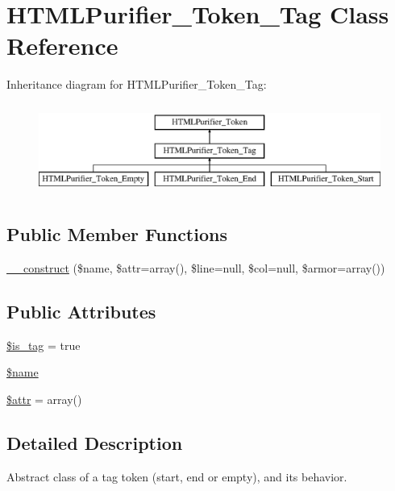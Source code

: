 \hypertarget{classHTMLPurifier__Token__Tag}{\section{H\+T\+M\+L\+Purifier\+\_\+\+Token\+\_\+\+Tag Class Reference}
\label{classHTMLPurifier__Token__Tag}
}
Inheritance diagram for H\+T\+M\+L\+Purifier\+\_\+\+Token\+\_\+\+Tag\+:\begin{figure}[H]
\begin{center}
\leavevmode
\includegraphics[height=3.000000cm]{classHTMLPurifier__Token__Tag}
\end{center}
\end{figure}
\subsection*{Public Member Functions}
\begin{DoxyCompactItemize}
\item 
\hyperlink{classHTMLPurifier__Token__Tag_a6666180bac25359b4228128745886c76}{\+\_\+\+\_\+construct} (\$name, \$attr=array(), \$line=null, \$col=null, \$armor=array())
\end{DoxyCompactItemize}
\subsection*{Public Attributes}
\begin{DoxyCompactItemize}
\item 
\hyperlink{classHTMLPurifier__Token__Tag_a974e4c3fdf940a938335c3aaba2e15b5}{\$is\+\_\+tag} = true
\item 
\hyperlink{classHTMLPurifier__Token__Tag_a11b476f2bf296541387212e5add8b88f}{\$name}
\item 
\hyperlink{classHTMLPurifier__Token__Tag_af97f0e1005e1e8cfd4a88a3dbc256c30}{\$attr} = array()
\end{DoxyCompactItemize}


\subsection{Detailed Description}
Abstract class of a tag token (start, end or empty), and its behavior. 

